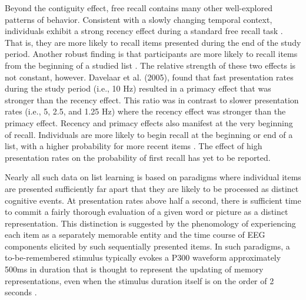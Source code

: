 \documentclass[10pt,letterpaper]{article}
\begin{document}
Beyond the contiguity effect, free recall contains many other well-explored patterns of behavior. Consistent with a slowly changing temporal context, individuals exhibit a strong recency effect during a standard free recall task \cite{SedeEtal08}. 
That is, they are more likely to recall items presented during the end of the study period. Another robust finding is that participants are more likely to recall items from the beginning of a studied list \cite{Murd62}. 
The relative strength of these two effects is not constant, however. Davelaar et al. (2005), found that fast presentation rates during the study period (i.e., 10 Hz) resulted in a primacy effect that was stronger than the recency effect. 
This ratio was in contrast to slower presentation rates (i.e., 5, 2.5, and 1.25 Hz) where the recency effect was stronger than the primacy effect. 
Recency and primacy effects also manifest at the very beginning of recall. Individuals are more likely to begin recall at the beginning or end of a list, with a higher probability for more recent items \cite{HowaKaha99}. The effect of high presentation rates on the probability of first recall has yet to be reported. 

\nocite{DaveEtal05}

Nearly all such data on list learning is  based on paradigms where individual items are presented sufficiently far apart that they are likely to be processed as distinct cognitive events. At presentation rates above half a second, there is sufficient time to commit a fairly thorough evaluation of a given word or picture as a distinct representation.  This distinction is suggested by the phenomology of experiencing each item as a separately memorable entity and the time course of EEG components elicited by such sequentially presented items. In such paradigms, a to-be-remembered stimulus typically evokes a P300 waveform approximately 500ms in duration that is thought to represent the updating of memory representations, even when the stimulus duration itself is on the order of 2 seconds \cite{Donc81}.
\end{document}
